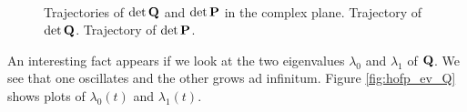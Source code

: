 \begin{figure}
  \centering
   \\
  \caption[Trajectories of the spread matrices]{
    Trajectories of $\det\mathbf{Q}$ and $\det\mathbf{P}$ in the complex plane.
     Trajectory of $\det\mathbf{Q}$.
     Trajectory of $\det\mathbf{P}$.
    \label{fig:hofp_traject_QP}
  }
\end{figure}

An interesting fact appears if we look at the two eigenvalues $\lambda_0$ and $\lambda_1$
of $\mathbf{Q}$. We see that one oscillates and the other grows ad infinitum. Figure
\ref{fig:hofp_ev_Q} shows plots of $\lambda_0(t)$ and $\lambda_1(t)$.

